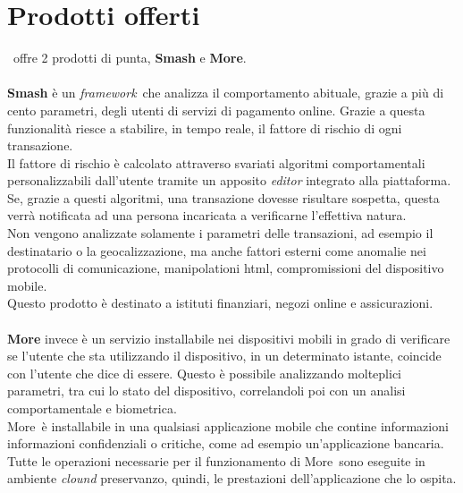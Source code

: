 \section{Prodotti offerti}
\azienda\ offre 2 prodotti di punta, \textbf{Smash\textregistered} e \textbf{More\textregistered}.\\
\\
\textbf{Smash\textregistered} è un \emph{framework}\glsfirstoccur\ che analizza il comportamento abituale, grazie a più di cento parametri, degli utenti di servizi di pagamento online. Grazie a questa funzionalità riesce a stabilire, in tempo reale, il fattore di rischio di ogni transazione.\\
Il fattore di rischio è calcolato attraverso svariati algoritmi comportamentali personalizzabili dall'utente tramite un apposito \textit{editor} integrato alla piattaforma. Se, grazie a questi algoritmi, una transazione dovesse risultare sospetta, questa verrà notificata ad una persona incaricata a verificarne l'effettiva natura.\\
Non vengono analizzate solamente i parametri delle transazioni, ad esempio il destinatario o la geocalizzazione, ma anche fattori esterni come anomalie nei protocolli di comunicazione, manipolationi html, compromissioni del dispositivo mobile.\\
Questo prodotto è destinato a istituti finanziari, negozi online e assicurazioni.\\
\\
\textbf{More\textregistered} invece è un servizio installabile nei dispositivi mobili in grado di verificare se l'utente che sta utilizzando il dispositivo, in un determinato istante, coincide con l'utente che dice di essere. Questo è possibile analizzando molteplici parametri, tra cui lo stato del dispositivo, correlandoli poi con un analisi comportamentale e biometrica.\\
More\textregistered\ è installabile in una qualsiasi applicazione mobile che contine informazioni informazioni confidenziali o critiche, come ad esempio un'applicazione bancaria.\\
Tutte le operazioni necessarie per il funzionamento di More\textregistered\ sono eseguite in ambiente \textit{clound} preservanzo, quindi, le prestazioni dell'applicazione che lo ospita.
\newpage


